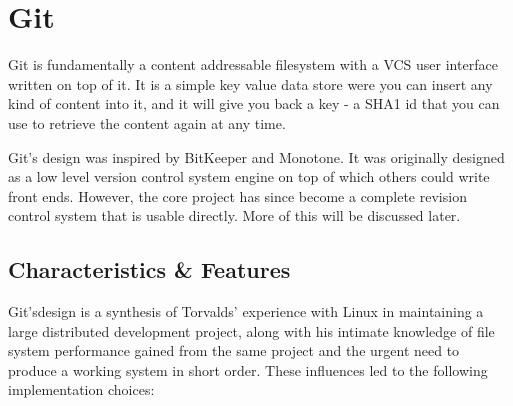 \section{Git}

Git is fundamentally a content addressable filesystem with a VCS user interface
written on top of it. It is a simple key value data store were you can insert
any kind of content into it, and it will give you back a key - a SHA1 id that
you can use to retrieve the content again at any time.

Git’s design was inspired\cite{inspiration} by BitKeeper and Monotone. It was
originally designed as a low level version control system engine on top of which
others could write front ends. However, the core project has since become a
complete revision control system that is usable directly. More of this will be
discussed later.

\subsection{Characteristics \& Features}


Git's\footnotemark[1] design is a synthesis of Torvalds’ experience with Linux
in maintaining a large distributed development project, along with his intimate
knowledge of file system performance gained from the same project and the urgent
need to produce a working system in short order. These influences led to the
following implementation choices:

